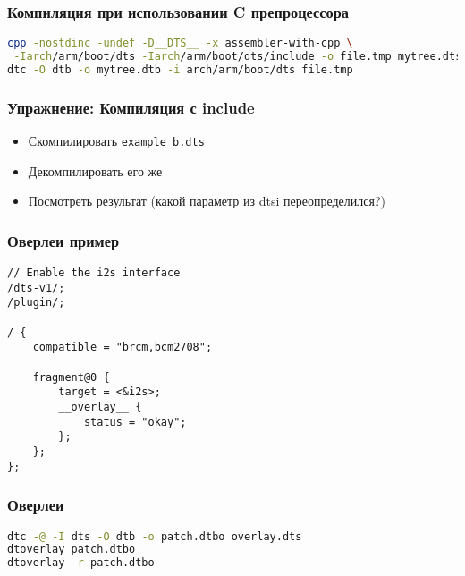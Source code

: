 \begin{frame}[fragile]
  \frametitle{Компиляция при использовании C препроцессора}
\begin{lstlisting}[language=bash]
cpp -nostdinc -undef -D__DTS__ -x assembler-with-cpp \
 -Iarch/arm/boot/dts -Iarch/arm/boot/dts/include -o file.tmp mytree.dts
dtc -O dtb -o mytree.dtb -i arch/arm/boot/dts file.tmp 
\end{lstlisting}
\end{frame}

\begin{frame}
  \frametitle{Упражнение: Компиляция с include}
  \begin{itemize}
    \item Скомпилировать \texttt{example\_b.dts}
    \item Декомпилировать его же
    \item Посмотреть результат (какой параметр из dtsi переопределился?)
  \end{itemize}

\end{frame}

\begin{frame}[fragile]
  \frametitle{Оверлеи пример}
\begin{lstlisting}
// Enable the i2s interface
/dts-v1/;
/plugin/;

/ {
    compatible = "brcm,bcm2708";

    fragment@0 {
        target = <&i2s>;
        __overlay__ {
            status = "okay";
        };
    };
};
\end{lstlisting}
\end{frame}
\begin{frame}[fragile]
 \frametitle{Оверлеи}
\begin{lstlisting}[language=bash]
dtc -@ -I dts -O dtb -o patch.dtbo overlay.dts
dtoverlay patch.dtbo
dtoverlay -r patch.dtbo
\end{lstlisting}
\end{frame}
